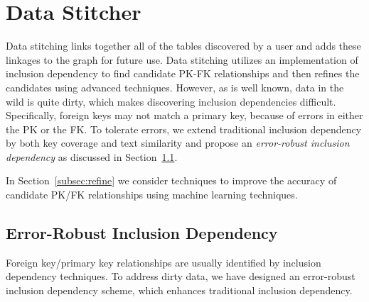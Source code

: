 \section{Data Stitcher}
\label{sec:stitching}

\newcommand{\eind}{error-robust inclusion dependency\xspace}
\newcommand{\ind}{inclusion dependency\xspace}
\newcommand{\R}{\ensuremath{R}\xspace}
\renewcommand{\S}{\ensuremath{S}\xspace}
\newcommand{\X}{\ensuremath{X}\xspace}
\newcommand{\Y}{\ensuremath{Y}\xspace}
\newcommand{\RX}{\ensuremath{\R[\X]}\xspace}
\newcommand{\SY}{\ensuremath{\S[\Y]}\xspace}
\newcommand{\IND}{IND\ensuremath{(\X,\Y)}\xspace}
\newcommand{\EIND}{\texttt{EIND}\ensuremath{(\RX,\SY)}\xspace}
\newcommand\subsetsim{\mathrel{%
  \ooalign{\raise0.3ex\hbox{$\subset$}\cr\hidewidth\raise-0.6ex\hbox{\scalebox{0.8}{$\sim$}}\hidewidth\cr}}}
\newcommand{\G}{\ensuremath{G}\xspace}
\newcommand{\E}{\ensuremath{E}\xspace}
\newcommand{\U}{\ensuremath{U}\xspace}
\newcommand{\V}{\ensuremath{V}\xspace}

\newtheorem{theorem}{Theorem}
\newtheorem{example}{Example}
\newtheorem{definition}{Definition}
\newtheorem{proposition}{Proposition}
\newtheorem{lemma}{Lemma}
\newtheorem{corollary}{Corollary}



Data stitching links together all of the tables discovered by a user and adds these linkages to the graph for future use. Data stitching utilizes an implementation of inclusion dependency to find candidate PK-FK relationships and then refines the candidates using advanced techniques. However, as is well known, data in the wild is quite dirty, which makes discovering inclusion dependencies difficult.  Specifically, foreign keys may not match a primary key, because of errors in either the PK or the FK. To tolerate errors, we extend traditional inclusion dependency by both key coverage and text similarity and propose an \emph{\eind} as discussed in Section~\ref{subsec:eind}.

In Section~\ref{subsec:refine} we consider techniques to improve the accuracy of candidate PK/FK relationships using machine learning techniques.


\subsection{Error-Robust Inclusion Dependency}\label{subsec:eind}

Foreign key/primary key relationships are usually identified by inclusion dependency techniques. To address dirty data, we have designed an error-robust inclusion dependency scheme, which enhances traditional inclusion dependency.

